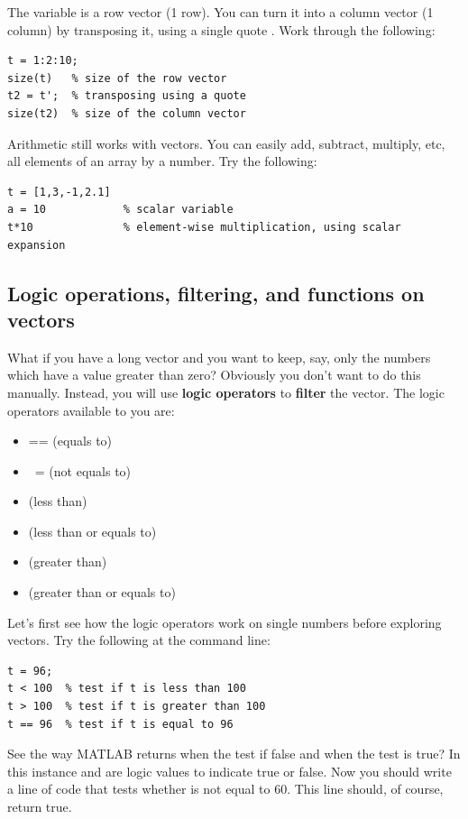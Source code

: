 \documentclass{article}
\begin{document}
\pagebreak
The variable  is a row vector (1 row).
You can turn it into a column vector (1 column) by transposing it, using a single quote .
Work through the following:
\begin{lstlisting}
t = 1:2:10;
size(t)   % size of the row vector
t2 = t';  % transposing using a quote
size(t2)  % size of the column vector
\end{lstlisting}

Arithmetic still works with vectors.
You can easily add, subtract, multiply, etc, all elements of an array by a number.
Try the following:
\begin{lstlisting}
t = [1,3,-1,2.1]
a = 10            % scalar variable
t*10              % element-wise multiplication, using scalar expansion
\end{lstlisting}

\subsection{Logic operations, filtering, and functions on vectors}

What if you have a long vector and you want to keep, say, only the numbers which have a value greater than zero?
Obviously you don't want to do this manually.
Instead, you will use \textbf{logic operators} to \textbf{filter} the vector.
The logic operators available to you are:
\begin{itemize}
\item {==} (equals to)
\item {~=} (not equals to)
\item \mcode{<} (less than)
\item \mcode{<=} (less than or equals to)
\item \mcode{>} (greater than)
\item \mcode{>=} (greater than or equals to)
\end{itemize}

Let's first see how the logic operators work on single numbers before exploring vectors.
Try the following at the command line:
\begin{lstlisting}
t = 96;
t < 100  % test if t is less than 100
t > 100  % test if t is greater than 100
t == 96  % test if t is equal to 96
\end{lstlisting}

See the way MATLAB returns  when the test if false and  when the test is true?
In this instance  and  are logic values to indicate true or false.
Now you should write a line of code that tests whether  is not equal to 60.
This line should, of course, return true.
\end{document}

